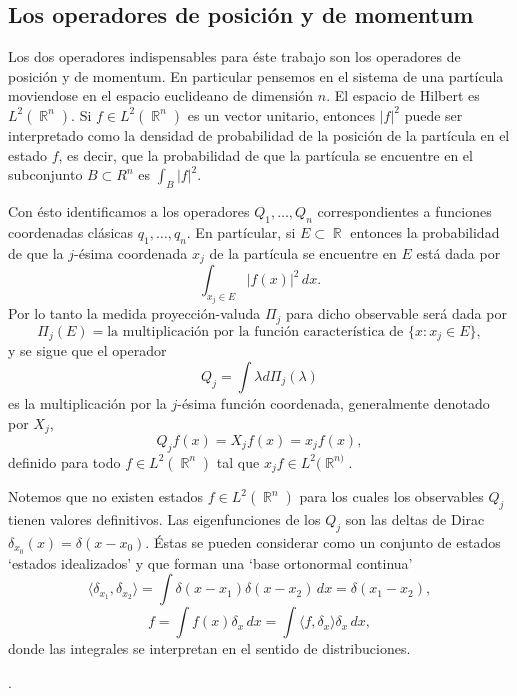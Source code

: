 \documentclass[a4paper]{report}
\DeclareMathOperator{\R}{\mathbb{R}}
\begin{document}
  
  \subsection{Los operadores de posición y de momentum}

  Los dos operadores indispensables para éste trabajo son
  los operadores de posición y de momentum. En particular
  pensemos en el sistema de una partícula moviendose en el
  espacio euclideano de dimensión $n$. El espacio de Hilbert
  es $L^2(\R^{n})$. Si $f \in L^2(\R^{n})$ es un vector
  unitario, entonces $|f|^2$ puede ser interpretado como la
  densidad de probabilidad de la posición de la partícula en
  el estado $f$, es decir, que la probabilidad de que la
  partícula se encuentre en el subconjunto $B \subset R^{n}$
  es $\int_B |f|^2$. 

  Con ésto identificamos a los operadores $Q_1,\ldots,Q_n$ 
  correspondientes a funciones coordenadas clásicas
  $q_1,\ldots,q_n$. En partícular, si $E \subset \R$ 
  entonces la probabilidad de que la $j$-ésima coordenada
  $x_j$ de la partícula se encuentre en $E$ está dada por
  \[
    \int_{x_j \in E} |f(x)|^2 \, dx.
  \] 
  Por lo tanto la medida proyección-valuda $\Pi_j$ para
  dicho observable será dada por
  \[
    \Pi_j(E) = 
    \text{la multiplicación por la función característica de
    } \{x : x_j \in E\},
  \] 
  y se sigue que el operador 
  \[
    Q_j = \int \lambda d\Pi_j(\lambda)
  \] 
  es la multiplicación por la $j$-ésima función coordenada,
  generalmente denotado por $X_j$, 
  \[
    Q_jf(x) = X_jf(x) = x_jf(x),
  \] 
  definido para todo $f \in L^2(\R^{n})$ tal que $x_jf \in
  L^2(\R^{n)}$.

  Notemos que no existen estados $f \in L^2(\R^{n})$ para
  los cuales los observables $Q_j$ tienen valores
  definitivos. Las eigenfunciones de los $Q_j$ son las
  deltas de Dirac $\delta_{x_0}(x) = \delta(x - x_0)$. Éstas
  se pueden considerar como un conjunto de estados `estados
  idealizados' y que forman una `base ortonormal continua'
  \[
    \langle \delta_{x_1}, \delta_{x_2} \rangle
    = \int \delta(x-x_1)\delta(x-x_2) \, dx
    = \delta(x_1-x_2),
  \] 
  \[
    f = \int f(x)\delta_x \, dx
    = \int \langle f, \delta_x \rangle \delta_x \, dx,
  \] 
  donde las integrales se interpretan en el sentido de
  distribuciones.


  .
\end{document}
